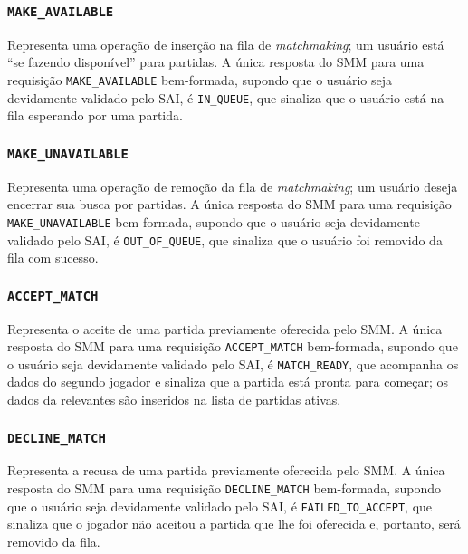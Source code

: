 \documentclass{article}
\begin{document}
\begin{multicols}{2}
    \subsubsection{\texttt{MAKE\_AVAILABLE}}
    
    Representa uma operação de inserção na fila de \textit{matchmaking}; um usuário está ``se fazendo disponível'' para partidas. A única resposta do SMM para uma requisição \texttt{MAKE\_AVAILABLE} bem-formada, supondo que o usuário seja devidamente validado pelo SAI, é \texttt{IN\_QUEUE}, que sinaliza que o usuário está na fila esperando por uma partida.
    
    \subsubsection{\texttt{MAKE\_UNAVAILABLE}}
    
    Representa uma operação de remoção da fila de \textit{match\-mak\-ing}; um usuário deseja encerrar sua busca por partidas. A única resposta do SMM para uma requisição \texttt{MAKE\_UNAVAILABLE} bem-formada, supondo que o usuário seja devidamente validado pelo SAI, é \texttt{OUT\_OF\_QUEUE}, que sinaliza que o usuário foi removido da fila com sucesso.
    
    \subsubsection{\texttt{ACCEPT\_MATCH}}
    
    Representa o aceite de uma partida previamente oferecida pelo SMM. A única resposta do SMM para uma requisição \texttt{ACCEPT\_MATCH} bem-formada, supondo que o usuário seja devidamente validado pelo SAI, é \texttt{MATCH\_READY}, que acompanha os dados do segundo jogador e sinaliza que a partida está pronta para começar; os dados da relevantes são inseridos na lista de partidas ativas.
    
    \subsubsection{\texttt{DECLINE\_MATCH}}
    
    Representa a recusa de uma partida previamente oferecida pelo SMM. A única resposta do SMM para uma requisição \texttt{DECLINE\_MATCH} bem-formada, supondo que o usuário seja devidamente validado pelo SAI, é \texttt{FAILED\_TO\_ACCEPT}, que sinaliza que o jogador não aceitou a partida que lhe foi oferecida e, portanto, será removido da fila.
    

\end{multicols}
\end{document}
